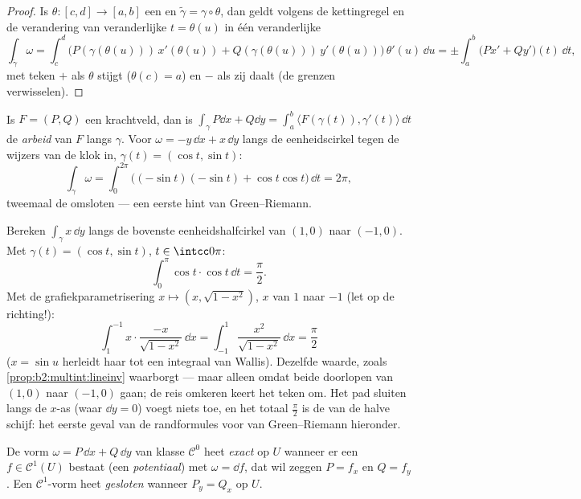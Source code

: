\begin{proof}
Is $\theta \colon [c, d] \to [a, b]$ een  en
$\tilde\gamma = \gamma \circ \theta$, dan geldt volgens de
kettingregel en de verandering van veranderlijke $t = \theta(u)$ in
één veranderlijke
\[
\int_{\tilde\gamma}\omega
= \int_c^d \bigl(P(\gamma(\theta(u)))\,x'(\theta(u))
+ Q(\gamma(\theta(u)))\,y'(\theta(u))\bigr)\,\theta'(u)\,\dd u
= \pm\int_a^b \bigl(Px' + Qy'\bigr)(t)\,\dd t ,
\]
met teken $+$ als $\theta$ stijgt ($\theta(c) = a$) en $-$ als zij
daalt (de grenzen verwisselen).
\end{proof}

\begin{example}\label{ex:b2:multint:work}
Is $F = (P, Q)$ een krachtveld, dan is $\int_\gamma P\dd x + Q\dd y
= \int_a^b \langle F(\gamma(t)), \gamma'(t)\rangle\,\dd t$ de
\emph{arbeid} van $F$ langs $\gamma$. Voor $\omega = -y\,\dd x +
x\,\dd y$ langs de eenheidscirkel tegen de wijzers van de klok in,
$\gamma(t) = (\cos t, \sin t)$:
\[
\int_\gamma \omega
= \int_0^{2\pi}\bigl((-\sin t)(-\sin t)
+ \cos t\cos t\bigr)\,\dd t = 2\pi ,
\]
tweemaal de omsloten  --- een eerste hint van
Green--Riemann.
\end{example}

\begin{example}\label{ex:b2:multint:semicircle}
Bereken $\int_\gamma x\,\dd y$ langs de bovenste
eenheidshalfcirkel van $(1, 0)$ naar $(-1, 0)$. Met $\gamma(t) =
(\cos t, \sin t)$, $t \in \intcc0\pi$:
\[
\int_0^\pi\cos t\cdot\cos t\,\dd t = \frac\pi2 .
\]
Met de grafiekparametrisering $x \mapsto (x, \sqrt{1 - x^2})$, $x$
van $1$ naar $-1$ (let op de richting!):
\[
\int_1^{-1}x\cdot\frac{-x}{\sqrt{1 - x^2}}\,\dd x
= \int_{-1}^{1}\frac{x^2}{\sqrt{1 - x^2}}\,\dd x
= \frac\pi2
\]
($x = \sin u$ herleidt haar tot een integraal van Wallis). Dezelfde
waarde, zoals \cref{prop:b2:multint:lineinv} waarborgt --- maar
alleen omdat beide doorlopen van $(1,0)$ naar $(-1,0)$ gaan; de
reis omkeren keert het teken om. Het pad sluiten langs de $x$-as
(waar $\dd y = 0$) voegt niets toe, en het totaal $\frac\pi2$ is de
 van de halve schijf: het eerste geval van de
randformules voor  van Green--Riemann hieronder.
\end{example}

\begin{definition}\label{def:b2:multint:exact}
De vorm $\omega = P\,\dd x + Q\,\dd y$ van klasse $\mathcal{C}^0$
heet \emph{exact} op $U$ wanneer er een $f \in
\mathcal{C}^1(U)$ bestaat (een
\emph{potentiaal}) met $\omega = \dd f$, dat wil
zeggen $P = f_x$ en $Q = f_y$. Een $\mathcal{C}^1$-vorm heet
\emph{gesloten} wanneer $P_y = Q_x$ op $U$.
\end{definition}

